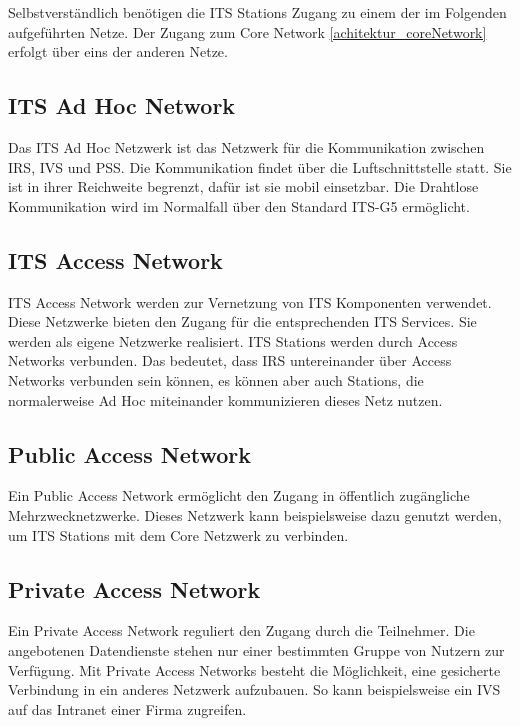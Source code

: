 Selbstverständlich benötigen die \ac{ITS} Stations Zugang zu einem der im Folgenden aufgeführten Netze. Der Zugang zum Core Network \ref{achitektur_coreNetwork} erfolgt über eins der anderen Netze. 

\subsection{ITS Ad Hoc Network\label{achitektur_adHocNetwork}}
Das \ac{ITS} Ad Hoc Netzwerk ist das Netzwerk für die Kommunikation zwischen \ac{IRS}, \ac{IVS} und \ac{PSS}. Die Kommunikation findet über die Luftschnittstelle statt. Sie ist in ihrer Reichweite begrenzt, dafür ist sie mobil einsetzbar. Die Drahtlose Kommunikation wird im Normalfall über den Standard ITS-G5 ermöglicht.


\subsection{ITS Access Network \label{architektur_itsAccessNetwork}}
ITS Access Network werden zur Vernetzung von \ac{ITS} Komponenten verwendet. Diese Netzwerke bieten den Zugang für die entsprechenden \ac{ITS} Services. Sie werden als eigene Netzwerke realisiert. \ac{ITS} Stations werden durch Access Networks verbunden. Das bedeutet, dass \ac{IRS} untereinander über Access Networks verbunden sein können, es können aber auch Stations, die normalerweise Ad Hoc miteinander kommunizieren dieses Netz nutzen. 

\subsection{Public Access Network}
Ein Public Access Network ermöglicht den Zugang in öffentlich zugängliche Mehrzwecknetzwerke. Dieses Netzwerk kann beispielsweise dazu genutzt werden, um \ac{ITS} Stations mit dem Core Netzwerk zu verbinden. 

\subsection{Private Access Network}
Ein Private Access Network reguliert den Zugang durch die Teilnehmer. Die angebotenen Datendienste stehen nur einer bestimmten Gruppe von Nutzern zur Verfügung. Mit Private Access Networks besteht die Möglichkeit, eine gesicherte Verbindung in ein anderes Netzwerk aufzubauen. So kann beispielsweise ein \ac{IVS} auf das Intranet einer Firma zugreifen. 

